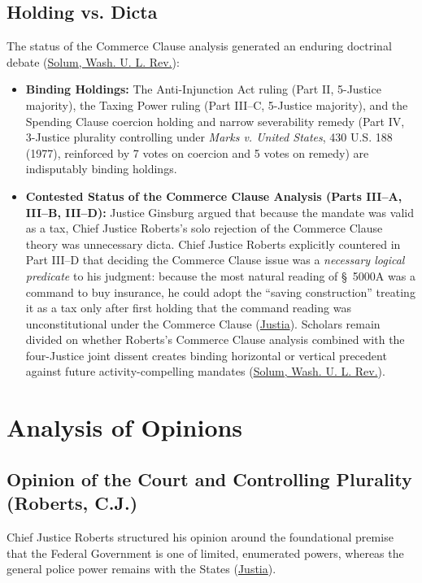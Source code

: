 \documentclass[12pt]{article}
\begin{document}
\subsection{Holding vs. Dicta}
The status of the Commerce Clause analysis generated an enduring doctrinal debate (\href{https://wustllawreview.org/wp-content/uploads/2021/10/91.1.1.pdf}{Solum, Wash. U. L. Rev.}):
\begin{itemize}
\item \textbf{Binding Holdings:} The Anti-Injunction Act ruling (Part II, 5-Justice majority), the Taxing Power ruling (Part III--C, 5-Justice majority), and the Spending Clause coercion holding and narrow severability remedy (Part IV, 3-Justice plurality controlling under \textit{Marks v. United States}, 430 U.S. 188 (1977), reinforced by 7 votes on coercion and 5 votes on remedy) are indisputably binding holdings.
\item \textbf{Contested Status of the Commerce Clause Analysis (Parts III--A, III--B, III--D):} Justice Ginsburg argued that because the mandate was valid as a tax, Chief Justice Roberts's solo rejection of the Commerce Clause theory was unnecessary dicta. Chief Justice Roberts explicitly countered in Part III--D that deciding the Commerce Clause issue was a \textit{necessary logical predicate} to his judgment: because the most natural reading of \S~5000A was a command to buy insurance, he could adopt the ``saving construction'' treating it as a tax only after first holding that the command reading was unconstitutional under the Commerce Clause (\href{https://supreme.justia.com/cases/federal/us/567/519/}{Justia}). Scholars remain divided on whether Roberts's Commerce Clause analysis combined with the four-Justice joint dissent creates binding horizontal or vertical precedent against future activity-compelling mandates (\href{https://wustllawreview.org/wp-content/uploads/2021/10/91.1.1.pdf}{Solum, Wash. U. L. Rev.}).
\end{itemize}

\section{Analysis of Opinions}
\subsection{Opinion of the Court and Controlling Plurality (Roberts, C.J.)}
Chief Justice Roberts structured his opinion around the foundational premise that the Federal Government is one of limited, enumerated powers, whereas the general police power remains with the States (\href{https://supreme.justia.com/cases/federal/us/567/519/}{Justia}).
\end{document}
